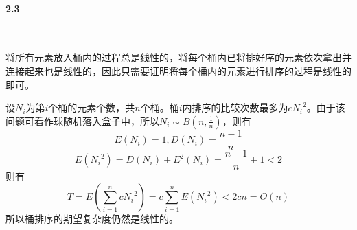 \paragraph{2.3}~{}

将所有元素放入桶内的过程总是线性的，将每个桶内已将排好序的元素依次拿出并连接起来也是线性的，因此只需要证明将每个桶内的元素进行排序的过程是线性的即可。


设$N_i$为第$i$个桶的元素个数，共$n$个桶。桶$i$内排序的比较次数最多为$c{N_i}^2$。由于该问题可看作球随机落入盒子中，所以$N_i \sim B(n,\frac{1}{n})$，则有
$$E(N_i)=1,D(N_i)=\frac{n-1}{n}$$
$$E({N_i}^2) = D(N_i)+E^2(N_i) = \frac{n-1}{n}+1 < 2$$
则有$$T=E(\sum_{i=1}^n{c{N_i}^2}) = c\sum_{i=1}^n{E({N_i}^2)} < 2cn = O(n)$$
所以桶排序的期望复杂度仍然是线性的。